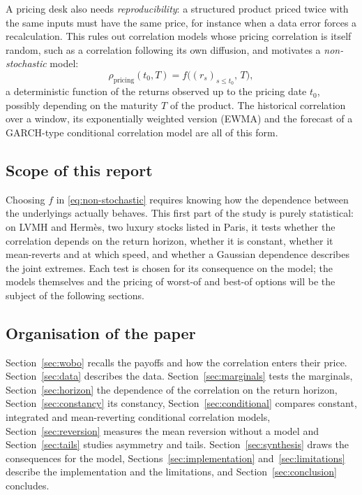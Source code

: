 \documentclass[11pt,a4paper]{article}
\begin{document}
A pricing desk also needs \emph{reproducibility}: a structured product priced twice with the same inputs must have
the same price, for instance when a data error forces a recalculation. This rules out correlation models whose
pricing correlation is itself random, such as a correlation following its own diffusion, and motivates a
\emph{non-stochastic} model:
\begin{equation}\label{eq:non-stochastic}
\rho_{\mathrm{pricing}}(t_0, T) = f\bigl((r_s)_{s \le t_0},\, T\bigr),
\end{equation}
a deterministic function of the returns observed up to the pricing date $t_0$, possibly depending on the maturity
$T$ of the product. The historical correlation over a window, its exponentially weighted version (EWMA) and the
forecast of a GARCH-type conditional correlation model are all of this form.

\subsection{Scope of this report}
Choosing $f$ in \eqref{eq:non-stochastic} requires knowing how the dependence between the underlyings actually
behaves. This first part of the study is purely statistical: on LVMH and Hermès, two luxury stocks listed in Paris,
it tests whether the correlation depends on the return horizon, whether it is constant, whether it mean-reverts and
at which speed, and whether a Gaussian dependence describes the joint extremes. Each test is chosen for its
consequence on the model; the models themselves and the pricing of worst-of and best-of options will be the subject of
the following sections.

\subsection{Organisation of the paper}
Section~\ref{sec:wobo} recalls the payoffs and how the correlation enters their price. Section~\ref{sec:data}
describes the data. Section~\ref{sec:marginals} tests the marginals, Section~\ref{sec:horizon} the dependence of the
correlation on the return horizon, Section~\ref{sec:constancy} its constancy, Section~\ref{sec:conditional} compares
constant, integrated and mean-reverting conditional correlation models, Section~\ref{sec:reversion} measures the mean
reversion without a model and Section~\ref{sec:tails} studies asymmetry and tails. Section~\ref{sec:synthesis}
draws the consequences for the model, Sections~\ref{sec:implementation} and~\ref{sec:limitations} describe the
implementation and the limitations, and Section~\ref{sec:conclusion} concludes.
\end{document}
